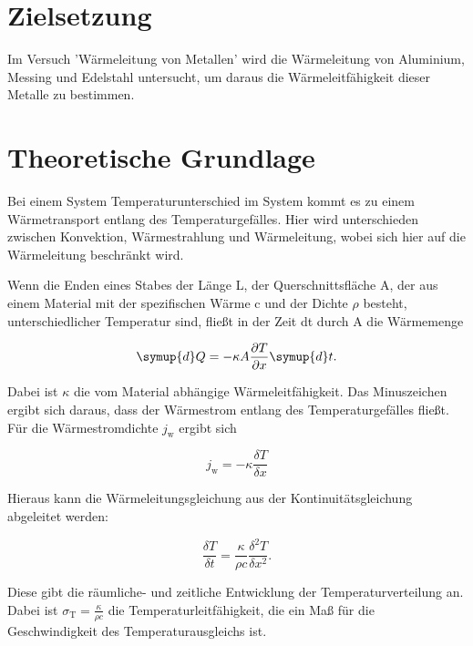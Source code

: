\section{Zielsetzung}
    Im Versuch 'Wärmeleitung von Metallen' wird die Wärmeleitung von Aluminium, Messing und Edelstahl untersucht,
    um daraus die Wärmeleitfähigkeit dieser Metalle zu bestimmen.

    \section{Theoretische Grundlage}
      Bei einem System Temperaturunterschied im System kommt es zu einem Wärmetransport entlang des Temperaturgefälles.
      Hier wird unterschieden zwischen Konvektion, Wärmestrahlung und Wärmeleitung, wobei sich hier auf die Wärmeleitung beschränkt wird.

      \noindent Wenn die Enden eines Stabes der Länge L, der Querschnittsfläche A, der aus einem Material mit der spezifischen Wärme c und der Dichte $\rho$ besteht, unterschiedlicher Temperatur sind,
      fließt in der Zeit dt durch A die Wärmemenge 

      \begin{equation}
      \symup{d}Q = - \kappa A \frac{\partial T}{\partial x} \symup{d}t .
        \label{eqn:waermemenge}
      \end{equation}

      \noindent Dabei ist $\kappa$ die vom Material abhängige Wärmeleitfähigkeit. 
      Das Minuszeichen ergibt sich daraus, dass der Wärmestrom entlang des Temperaturgefälles fließt.
      Für die Wärmestromdichte $j_\text{w}$ ergibt sich

      \begin{equation*}
      j_\text{w}=-\kappa \frac{\delta T}{\delta x}
        \label{eqn:waermestromdichte}
      \end{equation*}       
      
      \noindent Hieraus kann die Wärmeleitungsgleichung aus der Kontinuitätsgleichung abgeleitet werden:

      \begin{equation*}
      \frac{\delta T}{\delta t} = \frac{\kappa}{\rho c} \frac{\delta^2 T}{\delta x^2}.
        \label{eqn:waermeleitungsgleichung}
      \end{equation*}  

      \noindent Diese gibt die räumliche- und zeitliche Entwicklung der Temperaturverteilung an.
      Dabei ist $\sigma_\text{T} = \frac{\kappa}{\rho c}$ die Temperaturleitfähigkeit, die ein Maß für die Geschwindigkeit des Temperaturausgleichs ist.

